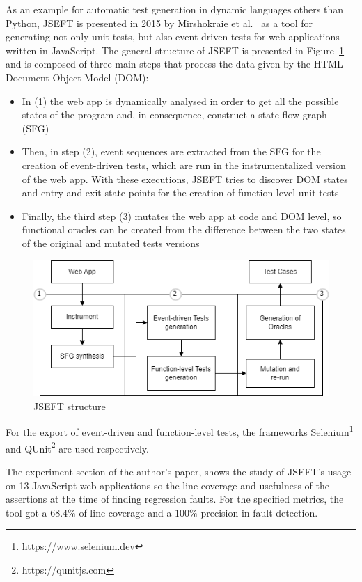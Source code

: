 \documentclass[%
  chapterprefix=false,%
  open=right,%
  twoside=true,%
  paper=a4,%
  logofile={Figures/logo.png},%
  thesistype=master,%
  UKenglish,%
]{se2thesis}
\begin{document}
As an example for automatic test generation in dynamic languages others than Python, JSEFT is presented in 2015 by Mirshokraie et al.~\cite{DBLP:conf/icst/Mirshokraie0P15} as a tool for generating not only unit tests, but also event-driven tests for web applications written in JavaScript.
The general structure of JSEFT is presented in Figure~\ref{fig:jseft} and is composed of three main steps that process the data given by the HTML Document Object Model (DOM):
\begin{itemize}
  \item In (1) the web app is dynamically analysed in order to get all the possible states of the program and, in consequence, construct a state flow graph (SFG)
  \item Then, in step (2), event sequences are extracted from the SFG for the creation of event-driven tests, which are run in the instrumentalized version of the web app.
  With these executions, JSEFT tries to discover DOM states and entry and exit state points for the creation of function-level unit tests
  \item Finally, the third step (3) mutates the web app at code and DOM level, so functional oracles can be created from the difference between the two states of the original and mutated tests versions
\end{itemize}

\begin{figure}[tb]
  \centering 
  \includegraphics[width=.99\textwidth]{Figures/jseft2.png}
  \caption{JSEFT structure}\label{fig:jseft}
\end{figure}

For the export of event-driven and function-level tests, the frameworks Selenium\footnote{https://www.selenium.dev} and QUnit\footnote{https://qunitjs.com} are used respectively.

The experiment section of the author's paper, shows the study of JSEFT's usage on 13 JavaScript web applications so the line coverage and usefulness of the assertions at the time of finding regression faults.
For the specified metrics, the tool got a \(68.4\%\) of line coverage and a \(100\%\) precision in fault detection.
\end{document}
